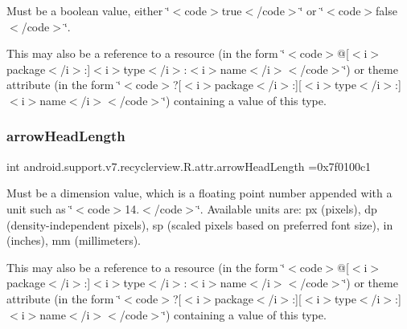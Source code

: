 Must be a boolean value, either \char`\"{}$<$code$>$true$<$/code$>$\char`\"{} or \char`\"{}$<$code$>$false$<$/code$>$\char`\"{}. 

This may also be a reference to a resource (in the form \char`\"{}$<$code$>$@\mbox{[}$<$i$>$package$<$/i$>$\+:\mbox{]}$<$i$>$type$<$/i$>$\+:$<$i$>$name$<$/i$>$$<$/code$>$\char`\"{}) or theme attribute (in the form \char`\"{}$<$code$>$?\mbox{[}$<$i$>$package$<$/i$>$\+:\mbox{]}\mbox{[}$<$i$>$type$<$/i$>$\+:\mbox{]}$<$i$>$name$<$/i$>$$<$/code$>$\char`\"{}) containing a value of this type. \mbox{\label{classandroid_1_1support_1_1v7_1_1recyclerview_1_1R_1_1attr_a63263e9439216fe4403743061d5dedd9}} 
\subsubsection{\texorpdfstring{arrow\+Head\+Length}{arrowHeadLength}}
{\footnotesize\ttfamily int android.\+support.\+v7.\+recyclerview.\+R.\+attr.\+arrow\+Head\+Length =0x7f0100c1\hspace{0.3cm}{\ttfamily [static]}}

Must be a dimension value, which is a floating point number appended with a unit such as \char`\"{}$<$code$>$14.\+5sp$<$/code$>$\char`\"{}. Available units are\+: px (pixels), dp (density-\/independent pixels), sp (scaled pixels based on preferred font size), in (inches), mm (millimeters). 

This may also be a reference to a resource (in the form \char`\"{}$<$code$>$@\mbox{[}$<$i$>$package$<$/i$>$\+:\mbox{]}$<$i$>$type$<$/i$>$\+:$<$i$>$name$<$/i$>$$<$/code$>$\char`\"{}) or theme attribute (in the form \char`\"{}$<$code$>$?\mbox{[}$<$i$>$package$<$/i$>$\+:\mbox{]}\mbox{[}$<$i$>$type$<$/i$>$\+:\mbox{]}$<$i$>$name$<$/i$>$$<$/code$>$\char`\"{}) containing a value of this type. \mbox{\label{classandroid_1_1support_1_1v7_1_1recyclerview_1_1R_1_1attr_a0048f9eb9d28d26c8ac747ad22ba7f50}} 
